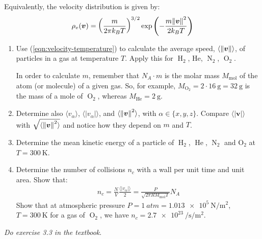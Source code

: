 \documentclass[../../main.tex]{subfiles}
\begin{document}
Equivalently, the velocity distribution is given by:
\begin{align}\label{eqn:velocity-temperature}
    \rho_v(\bm{v}) = \left(\frac{m}{2 \pi k_B T} \right)^{3/2} \exp\left(-\frac{m \norm{\bm{v}}^2}{2k_B T} \right)
\end{align}

\begin{exo}
    \begin{enumerate}[label=\alph*.]
        \item Use (\ref{eqn:velocity-temperature}) to calculate the average speed, $\langle \norm{\bm{v}} \rangle$, of particles in a gas at temperature $T$. Apply this for $\operatorname{H}_2$, He, $\operatorname{N}_2$, $\operatorname{O}_2$. 
        
        In order to calculate $m$, remember that $N_A \cdot m$ is the molar mass $M_{\mathrm{mol}}$ of the atom (or molecule) of a given gas. So, for example, $M_{\operatorname{O}_2} = 2 \cdot \SI{16}{\g} = \SI{32}{\g}$ is the mass of a mole of $\operatorname{O}_2$, whereas $M_{\operatorname{He}} = \SI{2}{\g}$. 
        \item Determine also $\langle v_\alpha \rangle$, $\langle |v_\alpha| \rangle$, and $\langle \norm{\bm{v}}^2 \rangle$, with $\alpha \in \{x,y,z\}$. Compare $\langle |\bm{v}| \rangle$ with $\sqrt{\langle \norm{\bm{v}}^2 \rangle}$ and notice how they depend on $m$ and $T$.
        \item Determine the mean kinetic energy of a particle of $\operatorname{H}_2$, $\operatorname{He}$, $\operatorname{N}_2$ and O$_2$ at $T=\SI{300}{\K}$.
        \item Determine the number of collisions $n_c$ with a wall per unit time and unit area. Show that:
        \begin{align*}
            n_c = \frac{N}{V} \frac{\langle |v_\alpha| \rangle}{2} = \frac{P}{\sqrt{2 \pi R M_{\mathrm{mol} }T}} N_A   
        \end{align*}
        Show that at atmospheric pressure $P=\SI{1}{atm} = \SI{1.013e5}{\N\per\m\squared}$, $T=\SI{300}{\K}$ for a gas of $\operatorname{O}_2$, we have $n_c= \SI{2.7e23}{\per\s\per\m\squared}$.
    \end{enumerate}
\end{exo}

\begin{exo}
    \textit{Do exercise 3.3 in the textbook}. 
\end{exo}
\end{document}
